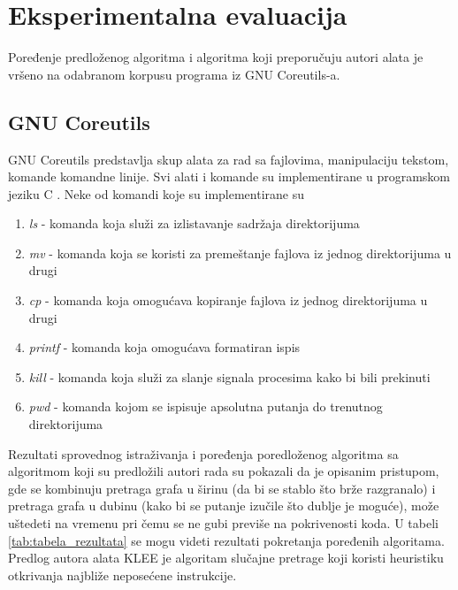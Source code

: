 \documentclass[12pt,oneside]{memoir}
\begin{document}
\section{Eksperimentalna evaluacija}
Poređenje predloženog algoritma i algoritma koji preporučuju autori alata je vršeno na odabranom korpusu programa iz GNU Coreutils-a. 

\subsection{GNU Coreutils}
GNU Coreutils predstavlja skup alata za rad sa fajlovima, manipulaciju tekstom, komande komandne linije. Svi alati i komande su implementirane u programskom jeziku C \cite{coreutils}. Neke od komandi koje su implementirane su 

\begin{enumerate}
    \item \textit{ls} - komanda koja služi za izlistavanje sadržaja direktorijuma
    
    \item \textit{mv} - komanda koja se koristi za premeštanje fajlova iz jednog direktorijuma u drugi
    
    \item \textit{cp} - komanda koja omogućava kopiranje fajlova iz jednog direktorijuma u drugi
    
    \item \textit{printf} - komanda koja omogućava formatiran ispis
    
    \item \textit{kill} - komanda koja služi za slanje signala procesima kako bi bili prekinuti
    
    \item \textit{pwd} - komanda kojom se ispisuje apsolutna putanja do trenutnog direktorijuma
\end{enumerate} 

Rezultati sprovednog istraživanja i poređenja poredloženog algoritma sa algoritmom koji su predložili autori rada su pokazali da je opisanim pristupom, gde se kombinuju pretraga grafa u širinu (da bi se stablo što brže razgranalo) i pretraga grafa u dubinu (kako bi se putanje izučile što dublje je moguće), može uštedeti na vremenu pri čemu se ne gubi previše na pokrivenosti koda. U tabeli \ref{tab:tabela_rezultata} se mogu videti rezultati pokretanja poređenih algoritama. Predlog autora alata KLEE \cite{klee} je algoritam slučajne pretrage koji koristi heuristiku otkrivanja najbliže neposećene instrukcije. 
\end{document}

